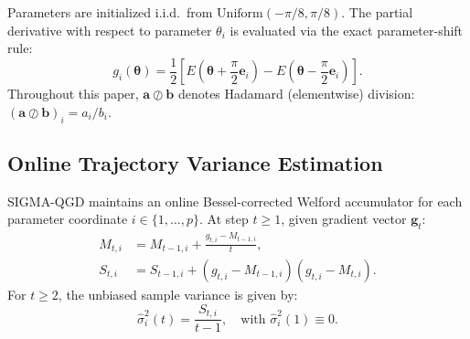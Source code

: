 \documentclass[11pt,a4paper]{article}
\begin{document}
Parameters are initialized i.i.d.\ from $\text{Uniform}(-\pi/8, \pi/8)$. The partial derivative with respect to parameter $\theta_i$ is evaluated via the exact parameter-shift rule:
\begin{equation}
g_i(\boldsymbol{\theta}) = \frac{1}{2} \left[ E\left(\boldsymbol{\theta} + \frac{\pi}{2}\mathbf{e}_i\right) - E\left(\boldsymbol{\theta} - \frac{\pi}{2}\mathbf{e}_i\right) \right].
\label{eq:param_shift}
\end{equation}
Throughout this paper, $\mathbf{a} \oslash \mathbf{b}$ denotes Hadamard (elementwise) division: $(\mathbf{a} \oslash \mathbf{b})_i = a_i / b_i$.

\subsection{Online Trajectory Variance Estimation}
SIGMA-QGD maintains an online Bessel-corrected Welford accumulator \cite{welford1962note} for each parameter coordinate $i \in \{1, \dots, p\}$. At step $t \ge 1$, given gradient vector $\mathbf{g}_t$:
\begin{align}
M_{t,i} &= M_{t-1,i} + \frac{g_{t,i} - M_{t-1,i}}{t}, \label{eq:welford_m} \\
S_{t,i} &= S_{t-1,i} + (g_{t,i} - M_{t-1,i})(g_{t,i} - M_{t,i}). \label{eq:welford_s}
\end{align}
For $t \ge 2$, the unbiased sample variance is given by:
\begin{equation}
\hat{\sigma}_i^2(t) = \frac{S_{t,i}}{t - 1}, \quad \text{with } \hat{\sigma}_i^2(1) \equiv 0.
\label{eq:welford_var}
\end{equation}
\end{document}

